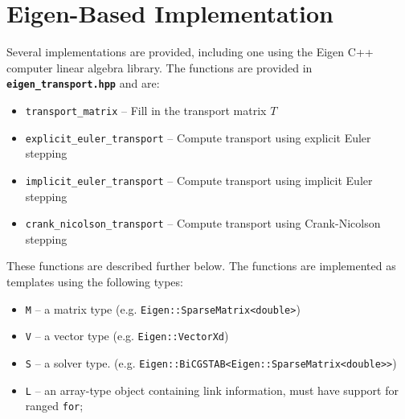 \documentclass[10pt]{report}
\newcommand{\filename}[1]{\textbf{\texttt{#1}}}
\begin{document}
\section{Eigen-Based Implementation}
Several implementations are provided, including one using the Eigen C++ computer linear
algebra library. The functions are provided in \filename{eigen\_transport.hpp} and are:
\begin{itemize}
\item \texttt{transport\_matrix} -- Fill in the transport matrix $T$
\item \texttt{explicit\_euler\_transport} -- Compute transport using explicit Euler stepping
\item \texttt{implicit\_euler\_transport} -- Compute transport using implicit Euler stepping
\item \texttt{crank\_nicolson\_transport} -- Compute transport using Crank-Nicolson stepping
\end{itemize}
These functions are described further below. The functions are implemented as templates
using the following types:
\begin{itemize}
\item \texttt{M} -- a matrix type (e.g. \texttt{Eigen::SparseMatrix\textless{}double\textgreater})
\item \texttt{V} -- a vector type (e.g. \texttt{Eigen::VectorXd})
\item \texttt{S} -- a solver type. (e.g. \texttt{Eigen::BiCGSTAB\textless{}Eigen::SparseMatrix\textless{}double\textgreater\textgreater})
\item \texttt{L} -- an array-type object containing link information, must have support for ranged \texttt{for};
\end{itemize}
\end{document}
